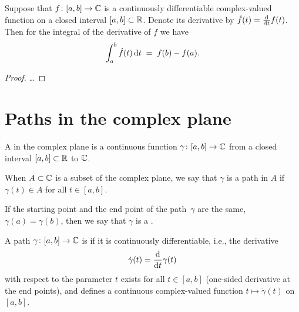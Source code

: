 \begin{lemma}
  \label{lem:ftc_for_complex_valued_integrals}
  Suppose that $f \colon [a,b] \to \mathbb{C}$ is a continuously differentiable
  complex-valued function on a closed interval $[a,b] \subset \mathbb{R}$.
  Denote its derivative by $\dot{f}(t) = \frac{\mathrm{d}}{\mathrm{d} t} f(t)$.
  Then for the integral of the derivative of $f$ we have
  \begin{align*}
    \int_a^b \dot{f}(t) \, \mathrm{d} t \; = \; f(b) - f(a) .
  \end{align*}
\end{lemma}
\begin{proof}
  \ldots
\end{proof}



\section{Paths in the complex plane}

\begin{definition}
  \label{def:path}
  A  in the complex plane is a continuous function $\gamma \colon [a,b] \to \mathbb{C}$
  from a closed interval $[a,b] \subset \mathbb{R}$ to $\mathbb{C}$.

  When $A \subset \mathbb{C}$ is a subset of the complex plane, we say that $\gamma$ is a path in $A$
  if $\gamma(t) \in A$ for all $t \in [a,b]$.

  If the starting point and the end point of the path~$\gamma$ are the same,
  $\gamma(a) = \gamma(b)$, then we say that $\gamma$ is a .
\end{definition}

\begin{definition}
  \label{def:smooth_path}
  A path $\gamma \colon [a,b] \to \mathbb{C}$ is 
  if it is continuously differentiable, i.e., the derivative
  \begin{align*}
    \dot{\gamma}(t) = \frac{\mathrm{d}}{\mathrm{d} t} \gamma(t)
  \end{align*}
  with respect to the parameter $t$
  exists for all $t \in [a,b]$ (one-sided derivative at the end points),
  and defines a continuous complex-valued function $t \mapsto \dot{\gamma}(t)$
  on $[a,b]$.
\end{definition}

